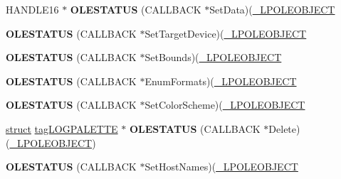 \begin{DoxyCompactItemize}
H\+A\+N\+D\+L\+E16 $\ast$ {\bfseries O\+L\+E\+S\+T\+A\+T\+US} (C\+A\+L\+L\+B\+A\+CK $\ast$Set\+Data)(\hyperlink{struct___o_l_e_o_b_j_e_c_t}{\+\_\+\+L\+P\+O\+L\+E\+O\+B\+J\+E\+CT}
\item 
\mbox{\label{struct___o_l_e_o_b_j_e_c_t_v_t_b_l_ade94b4da0d88fef39b8cb32a4a2dc483}} 
{\bfseries O\+L\+E\+S\+T\+A\+T\+US} (C\+A\+L\+L\+B\+A\+CK $\ast$Set\+Target\+Device)(\hyperlink{struct___o_l_e_o_b_j_e_c_t}{\+\_\+\+L\+P\+O\+L\+E\+O\+B\+J\+E\+CT}
\item 
\mbox{\label{struct___o_l_e_o_b_j_e_c_t_v_t_b_l_a54592ea713ff0a0ba802fdb7a42ca3a8}} 
{\bfseries O\+L\+E\+S\+T\+A\+T\+US} (C\+A\+L\+L\+B\+A\+CK $\ast$Set\+Bounds)(\hyperlink{struct___o_l_e_o_b_j_e_c_t}{\+\_\+\+L\+P\+O\+L\+E\+O\+B\+J\+E\+CT}
\item 
\mbox{\label{struct___o_l_e_o_b_j_e_c_t_v_t_b_l_a62fa260b26625256a2d83e5c717c0b0e}} 
{\bfseries O\+L\+E\+S\+T\+A\+T\+US} (C\+A\+L\+L\+B\+A\+CK $\ast$Enum\+Formats)(\hyperlink{struct___o_l_e_o_b_j_e_c_t}{\+\_\+\+L\+P\+O\+L\+E\+O\+B\+J\+E\+CT}
\item 
\mbox{\label{struct___o_l_e_o_b_j_e_c_t_v_t_b_l_a78d96a5e928a20ae31915441587fbbfe}} 
{\bfseries O\+L\+E\+S\+T\+A\+T\+US} (C\+A\+L\+L\+B\+A\+CK $\ast$Set\+Color\+Scheme)(\hyperlink{struct___o_l_e_o_b_j_e_c_t}{\+\_\+\+L\+P\+O\+L\+E\+O\+B\+J\+E\+CT}
\item 
\mbox{\label{struct___o_l_e_o_b_j_e_c_t_v_t_b_l_a3b6eca662c4919f64eab881e14d5e134}} 
\hyperlink{interfacestruct}{struct} \hyperlink{structtag_l_o_g_p_a_l_e_t_t_e}{tag\+L\+O\+G\+P\+A\+L\+E\+T\+TE} $\ast$ {\bfseries O\+L\+E\+S\+T\+A\+T\+US} (C\+A\+L\+L\+B\+A\+CK $\ast$Delete)(\hyperlink{struct___o_l_e_o_b_j_e_c_t}{\+\_\+\+L\+P\+O\+L\+E\+O\+B\+J\+E\+CT})
\item 
\mbox{\label{struct___o_l_e_o_b_j_e_c_t_v_t_b_l_aa9f41696ef4e9a6b56cd1ce35487cf12}} 
{\bfseries O\+L\+E\+S\+T\+A\+T\+US} (C\+A\+L\+L\+B\+A\+CK $\ast$Set\+Host\+Names)(\hyperlink{struct___o_l_e_o_b_j_e_c_t}{\+\_\+\+L\+P\+O\+L\+E\+O\+B\+J\+E\+CT}
\item 
\mbox{\label{struct___o_l_e_o_b_j_e_c_t_v_t_b_l_afeceda06c6b358cb37b5ea780196e136}} 

\end{DoxyCompactItemize}
